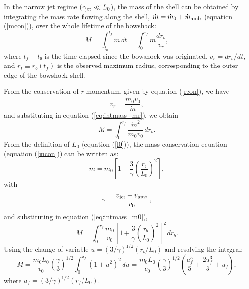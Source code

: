 \documentclass[12pt]{mythesis}
\begin{document}

In the narrow jet regime ($r_{\rm jet}\ll L_0$), the mass of the shell can be obtained by integrating the mass rate flowing along the shell, $\dot m=\dot{m}_0+\dot{m}_{\rm amb}$ (equation (\ref{mcon})), over the whole lifetime of the bowshock: 
\begin{equation}\label{eq:intmass_mr}
	M=\int_{t_0}^{t_f}\dot{m}\, dt = \int_0^{r_{f}}\dot{m} \frac{dr_b}{v_r}, 
\end{equation}
where $t_f-t_0$ is the time elapsed since the bowshock was originated, $v_r=dr_b/dt$, 
and $r_f \equiv r_{b}(t_f)$ is the observed maximum radius, corresponding to the outer edge of the bowshock shell.

From the conservation of $r$-momentum, given by equation (\ref{rcon}), we have 
\begin{equation}
	v_r = \frac{\dot{m}_0 v_0}{\dot{m}},
\end{equation}
and substituting in equation (\ref{eq:intmass_mr}), we obtain
\begin{equation}\label{eq:intmass_m0}
M=\int_0^{r_{f}}\frac{\dot{m}^2}{\dot{m}_0 v_0}\, dr_b.
\end{equation}
From the definition of $L_0$ (equation (\ref{l0})), the mass conservation equation (equation (\ref{mcon})) can be written as:
\begin{equation}\label{eq:mdotm0}
	\dot{m} = \dot{m}_0\left[1+\frac{3}{\gamma}\left(\frac{r_b}{L_0}\right)^2\right],
\end{equation}
with
\begin{equation}
	\gamma\equiv \frac{v_{\rm jet}-v_{\rm amb}}{v_0}\,,
  \label{gam}
\end{equation}
and substituting in equation (\ref{eq:intmass_m0}),
\begin{equation}
M=\int_0^{r_{f}}\frac{\dot{m}_0}{v_0}\left[1+\frac{3}{\gamma}\left(\frac{r_b}{L_0}\right)^2\right]^2\, dr_b.
\end{equation}
 Using the change of variable $u=(3/\gamma)^{1/2} (r_b/L_0)$ %
and resolving the integral:
\begin{equation}
M=\frac{\dot{m}_0L_0}{v_0}\left(\frac{\gamma}{3}\right)^{1/2}\int_0^{u_f}\left(1+u^2\right)^2\, du= \frac{\dot{m}_0L_0}{v_0}\left(\frac{\gamma}{3}\right)^{1/2}\left(\frac{u_f^5}{5} + \frac{2u_f^3}{3} + u_f\right),
\end{equation}
where $u_f=(3/\gamma)^{1/2} (r_{f}/L_0)$. 
\end{document}
